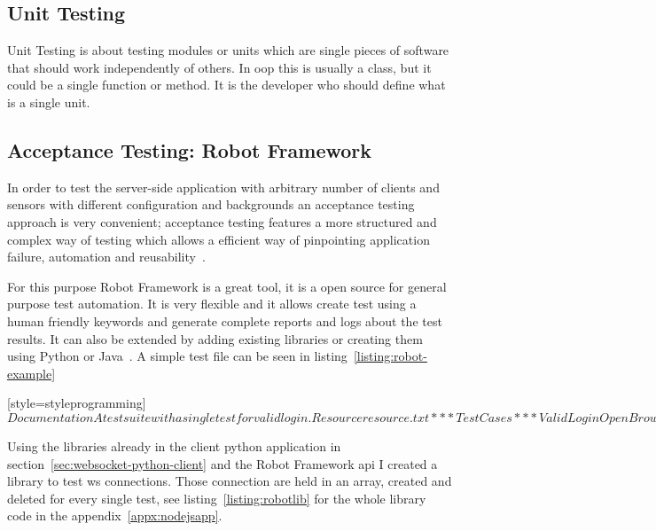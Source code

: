 \documentclass[hidelinks,11pt,a4paper,oneside,article]{memoir}
\begin{document}
\subsection{Unit Testing}
Unit Testing is about testing modules or units which are single pieces of software that should work independently of others. In \gls{oop} this is usually a class, but it could be a single function or method. It is the developer who should define what is a single unit.
\subsection{Acceptance Testing: Robot Framework}
In order to test the server-side application with arbitrary number of clients and sensors with different configuration and backgrounds an acceptance testing approach is very convenient; acceptance testing features a more structured and complex way of testing which allows a efficient way of pinpointing application failure, automation and reusability~\cite{bisht2013robot}.

For this purpose Robot Framework is a great tool, it is a open source for general purpose test automation. It is very flexible and it allows create test using a human friendly keywords and generate complete reports and logs about the test results. It can also be extended by adding existing libraries or creating them using Python or Java~\cite{robotframe}.
A simple test file can be seen in listing~\ref{listing:robot-example}

[style=styleprogramming]$
Documentation     A test suite with a single test for valid login.
Resource          resource.txt

*** Test Cases ***
Valid Login
Open Browser To Login Page
Input Username    demo
Input Password    mode
Submit Credentials
Welcome Page Should Be Open
[Teardown]    Close Browser
$

Using the libraries already in the client python application in section~\ref{sec:websocket-python-client} and the Robot Framework \gls{api} I created a library to test \gls{ws} connections. Those connection are held in an array, created and deleted for every single test, see listing~\ref{listing:robotlib} for the whole library code in the appendix~\ref{appx:nodejsapp}.
\end{document}
